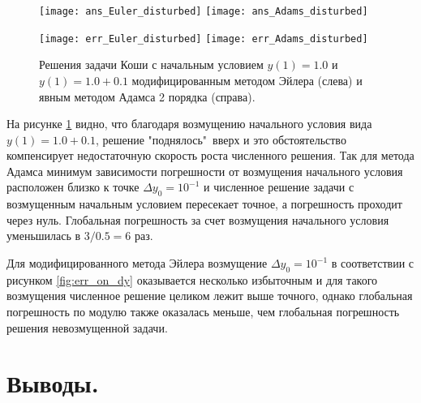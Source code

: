 \documentclass[a4paper, 12pt]{article}
\theoremstyle{mythm}
\begin{document}
	\begin{figure}[H]\centering
		\texttt{[image: ans\_Euler\_disturbed]}
		\texttt{[image: ans\_Adams\_disturbed]}
	\end{figure}
	
	\begin{figure}[H]\centering
		\texttt{[image: err\_Euler\_disturbed]}
		\texttt{[image: err\_Adams\_disturbed]}
		\caption{Решения задачи Коши с начальным условием $y(1)=1.0$ и $y(1)=1.0+0.1$ модифицированным методом Эйлера (слева) и явным методом Адамса 2 порядка (справа).}\label{fig:disturbed}
	\end{figure}

	На рисунке \ref{fig:disturbed} видно, что благодаря возмущению начального условия вида $y(1)=1.0 + 0.1$, решение "поднялось"\ вверх и это обстоятельство компенсирует недостаточную скорость роста численного решения. Так для метода Адамса минимум зависимости погрешности от возмущения начального условия расположен близко к точке $\Delta y_0 = 10^{-1}$ и численное решение задачи с возмущенным начальным условием пересекает точное, а погрешность проходит через нуль. Глобальная погрешность за счет возмущения начального условия уменьшилась в $3/0.5=6$ раз.
	
	Для модифицированного метода Эйлера возмущение $\Delta y_0 = 10^{-1}$ в соответствии с рисунком \ref{fig:err_on_dy} оказывается несколько избыточным и для такого возмущения численное решение целиком лежит выше точного, однако глобальная погрешность по модулю также оказалась меньше, чем глобальная погрешность решения невозмущенной задачи.
	
	\section{Выводы.}
	
\end{document}
